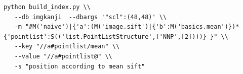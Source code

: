 \documentclass{report}
\begin{document}
\begin{lstlisting}
python build_index.py \\
   --db imgkanji  --dbargs '"scl":(48,48)' \\
   -m "#M('naive')|{'a':(M('image.sift')|{'b':M('basics.mean')})*{'pointlist':S(('list.PointListStructure',('NNP',[2])))} }" \\
   --key "//a#pointlist/mean" \\ 
   --value "//a#pointlist@" \\
   -s "position according to mean sift"

\end{lstlisting}
\end{document}
